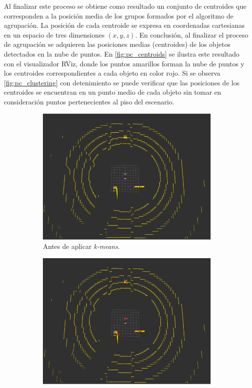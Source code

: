 Al finalizar este proceso se obtiene como resultado un conjunto de centroides que corresponden a la posición media de los grupos formados por el algoritmo de agrupación. La posición de cada centroide se expresa en coordenadas cartesianas en un espacio de tres dimensiones $(x, y, z)$. En conclusión, al finalizar el proceso de agrupación se adquieren las posiciones medias (centroides) de los objetos detectados en la nube de puntos. En \ref{fig:pc_centroids} se ilustra este resultado con el visualizador RViz, donde los puntos amarillos forman la nube de puntos y los centroides correspondientes a cada objeto en color rojo. Si se observa \ref{fig:pc_clustering} con detenimiento se puede verificar que las posiciones de los centroides se encuentran en un punto medio de cada objeto sin tomar en consideración puntos pertenecientes al piso del escenario.
\begin{figure}[h]
    \centering
    \begin{subfigure}[b]{0.45\textwidth}
         \centering
         \includegraphics[width=\textwidth]{Figures/Figures_Cap05/pc_objects.png}
         \caption{Antes de aplicar \textit{k-means}.}
         \label{fig:pc_objects}
    \end{subfigure}
    \hfill
    \begin{subfigure}[b]{0.45\textwidth}
         \centering
         \includegraphics[width=\textwidth]{Figures/Figures_Cap05/pc_centroids.png}

\end{subfigure}
\end{figure}
